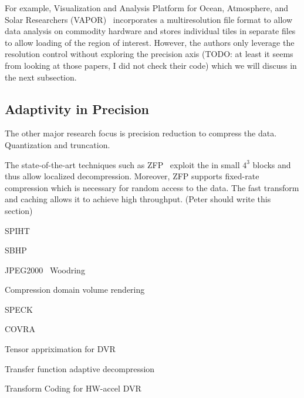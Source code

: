 For example, Visualization and Analysis Platform for Ocean, Atmosphere, and Solar Researchers
(VAPOR)~\cite{multires_toolkit2003, vapor2007} incorporates a multiresolution file
format to allow data analysis on commodity hardware and stores individual tiles in
separate files to allow loading of the region of interest.
However, the authors only leverage the resolution control without exploring the precision axis
(TODO: at least it seems from looking at those papers, I did not check their code) which
we will discuss in the next subsection.


\subsection{Adaptivity in Precision}
The other major research focus is precision reduction to compress the data. Quantization and
truncation.

The state-of-the-art techniques such as ZFP~\cite{zfp2014} exploit the in small $4^3$ blocks
and thus allow localized decompression. Moreover, ZFP supports fixed-rate compression which
is necessary for random access to the data. The fast transform and caching allows it to
achieve high throughput. (Peter should write this section)


SPIHT~\cite{spiht1996}


SBHP~\cite{sbhp2000}

JPEG2000~\cite{jpeg2001}
Woodring~\cite{woodring2011}

Compression domain volume rendering~\cite{compression_domain2003}

SPECK~\cite{speck2004}

COVRA~\cite{covra2012}

Tensor appriximation for DVR~\cite{tensor_dvr2015}

Transfer function adaptive decompression~\cite{tf_decompression2004}

Transform Coding for HW-accel DVR~\cite{hw_dvr2007}

